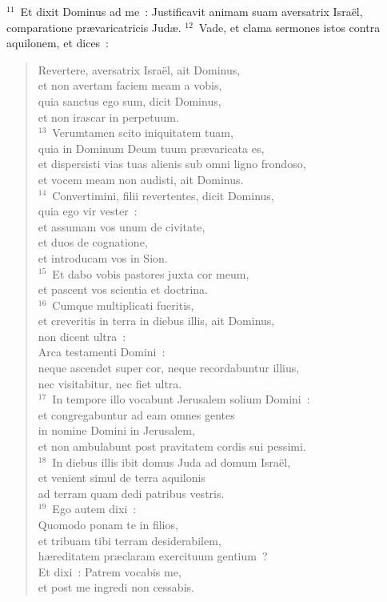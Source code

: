 ${}^{11}$~Et dixit Dominus ad me~: Justificavit animam suam aversatrix Isra\"el, comparatione pr\ae varicatricis Jud\ae .
${}^{12}$~Vade, et clama sermones istos contra aquilonem, et dices~: \begin{verse}Revertere, aversatrix Isra\"el, ait Dominus,\\ et non avertam faciem meam a vobis,\\ quia sanctus ego sum, dicit Dominus,\\ et non irascar in perpetuum.\\
${}^{13}$~Verumtamen scito iniquitatem tuam,\\ quia in Dominum Deum tuum pr\ae varicata es,\\ et dispersisti vias tuas alienis sub omni ligno frondoso,\\ et vocem meam non audisti, ait Dominus.\\
${}^{14}$~Convertimini, filii revertentes, dicit Dominus,\\ quia ego vir vester~:\\ et assumam vos unum de civitate,\\ et duos de cognatione,\\ et introducam vos in Sion.\\
${}^{15}$~Et dabo vobis pastores juxta cor meum,\\ et pascent vos scientia et doctrina.\\
${}^{16}$~Cumque multiplicati fueritis,\\ et creveritis in terra in diebus illis, ait Dominus,\\ non dicent ultra~:\\ Arca testamenti Domini~:\\ neque ascendet super cor, neque recordabuntur illius,\\ nec visitabitur, nec fiet ultra.\\
${}^{17}$~In tempore illo vocabunt Jerusalem solium Domini~:\\ et congregabuntur ad eam omnes gentes\\ in nomine Domini in Jerusalem,\\ et non ambulabunt post pravitatem cordis sui pessimi.\\
${}^{18}$~In diebus illis ibit domus Juda ad domum Isra\"el,\\ et venient simul de terra aquilonis\\ ad terram quam dedi patribus vestris.\\
${}^{19}$~Ego autem dixi~:\\ Quomodo ponam te in filios,\\ et tribuam tibi terram desiderabilem,\\ h\ae reditatem pr\ae claram exercituum gentium~?\\ Et dixi~: Patrem vocabis me,\\ et post me ingredi non cessabis.\\

\end{verse}
